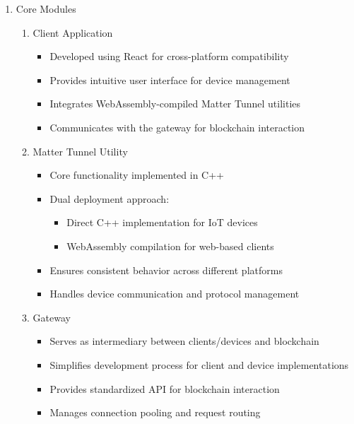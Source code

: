 \documentclass[conference]{IEEEtran}
\begin{document}
\begin{enumerate}[itemsep=2ex, parsep=1ex]
	\item{Core Modules}
			
	\begin{enumerate}
		\item Client Application
		      \begin{itemize}[itemsep=0.5pt, parsep=0.5pt]
		      	\item Developed using React for cross-platform compatibility
		      	\item Provides intuitive user interface for device management
		      	\item Integrates WebAssembly-compiled Matter Tunnel utilities
		      	\item Communicates with the gateway for blockchain interaction
		      \end{itemize}
		      		      		      
		\item Matter Tunnel Utility
		      \begin{itemize}[itemsep=0.5pt, parsep=0.5pt]
		      	\item Core functionality implemented in C++
		      	\item Dual deployment approach:
		      	      \begin{itemize}[itemsep=0.5pt, parsep=0.5pt]
		      	      	\item Direct C++ implementation for IoT devices
		      	      	\item WebAssembly compilation for web-based clients
		      	      \end{itemize}
		      	\item Ensures consistent behavior across different platforms
		      	\item Handles device communication and protocol management
		      \end{itemize}
		      		      		      
		\item Gateway
		      \begin{itemize}[itemsep=0.5pt, parsep=0.5pt]
		      	\item Serves as intermediary between clients/devices and blockchain
		      	\item Simplifies development process for client and device implementations
		      	\item Provides standardized API for blockchain interaction
		      	\item Manages connection pooling and request routing
		      \end{itemize}
		      		      		      

\end{enumerate}
\end{enumerate}
\end{document}

